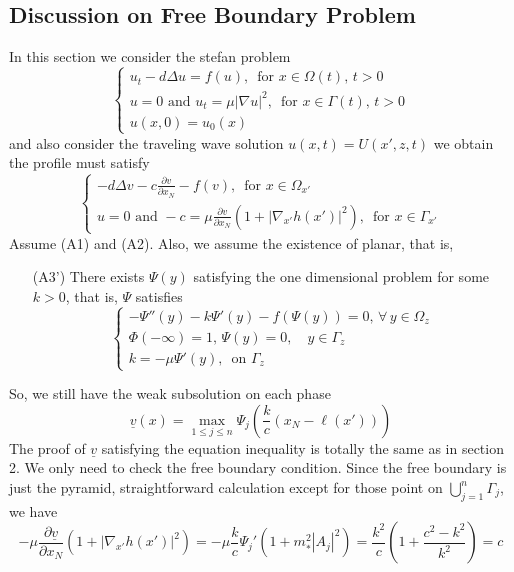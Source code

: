 \documentclass[12pt, a4paper]{article}
\numberwithin{equation}{section}
\newcommand{\pd}[2]{\frac{\partial #1}{\partial #2}}
\begin{document}
\begin{CJK}{UTF8}{bkai}
\section{Discussion on Free Boundary Problem}
	In this section we consider the stefan problem
\begin{equation}\label{iden3.1}
\begin{cases}
	u_t-d\Delta u=f(u),\,\mbox{ for }x\in\Omega(t),\,t>0\\
	u=0\mbox{ and }u_t=\mu|\nabla u|^2,\,\mbox{ for }x\in\Gamma(t),\,t>0\\
	u(x,0)=u_0(x)
\end{cases}
\end{equation}
and also consider the traveling wave solution $u(x,t)=U(x',z,t)$ we obtain the profile must satisfy
\begin{equation}
\begin{cases}
	-d\Delta v-c\pd{v}{x_N}-f(v),\,\mbox{ for }x\in\Omega_{x'}\\
	u=0\mbox{ and }-c=\mu\pd{v}{x_N}(1+|\nabla_{x'}h(x')|^2),\,\mbox{ for }x\in\Gamma_{x'}
\end{cases}
\end{equation}
	Assume (A1) and (A2). Also, we assume the existence of planar, that is,
\begin{enumerate}
	\item[(A3')] There exists $\Psi(y)$ satisfying the one dimensional problem for some $k>0$, that is, $\Psi$ satisfies
	\begin{equation}
	\begin{cases}
		-\Psi''(y)-k\Psi'(y)-f(\Psi(y))=0,\,\forall\,y\in\Omega_{z}\\
		\Phi(-\infty)=1,\,\Psi(y)=0,\quad y\in\Gamma_z\\
		k=-\mu\Psi'(y),\,\mbox{ on }\Gamma_z
	\end{cases}
	\end{equation}
\end{enumerate}

So, we still have the weak subsolution on each phase
\begin{equation}
	\underline{v}(x)=\max_{1\leq j\leq n}\Psi_j\left(\frac{k}{c}(x_N-\ell(x'))\right)
\end{equation}
The proof of $\underline{v}$ satisfying the equation inequality is totally the same as in section 2. We only need to check the free boundary condition. Since the free boundary is just the pyramid, straightforward calculation except for those point on $\bigcup\limits_{j=1}^n\Gamma_j$, we have
\[
	-\mu\pd{\underline{v}}{x_N}(1+|\nabla_{x'} h(x')|^2)=-\mu\frac{k}{c}\Psi_j'(1+m_*^2|A_j|^2)=\frac{k^2}{c}(1+\frac{c^2-k^2}{k^2})=c
\]



\end{CJK}
\end{document}
